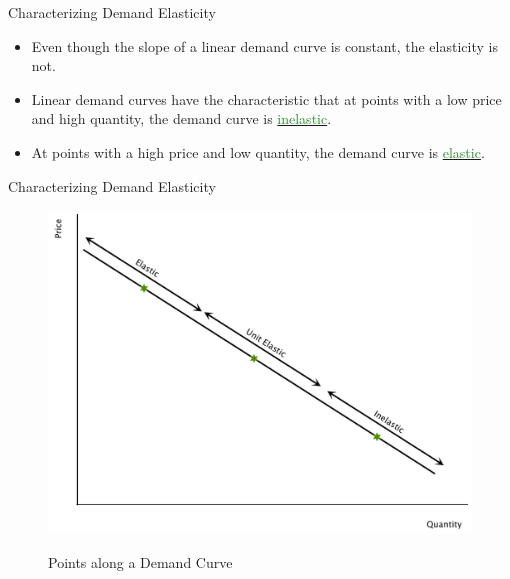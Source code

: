 \documentclass[xcolor={dvipsnames},pdf, hyperref={colorlinks=true, citecolor=ForestGreen, linkcolor=BlueViolet, urlcolor=Magenta}]{beamer}
\newcommand{\ddp}[1]{{\textcolor{ForestGreen}{#1}}}
\newcommand{\dd}[1]{{\underline{\textcolor{ForestGreen}{#1}}}}
\begin{document}
\begin{frame}{Characterizing Demand Elasticity}

\begin{itemize}
\item Even though the slope of a linear demand curve is constant, the elasticity is not. 
\item Linear demand curves have the characteristic that at points with a low price and high quantity, the demand curve is \dd{inelastic}. 
\item At points with a high price and low quantity, the demand curve is \dd{elastic}.
\end{itemize}
	
\end{frame}



\begin{frame}{Characterizing Demand Elasticity}
	
	\begin{figure}[H]
	\centering
	\ddp{\includegraphics[scale=.25]{plot23.pdf}}
	\caption{Points along a Demand Curve}
\end{figure}
	
\end{frame}
\end{document}
